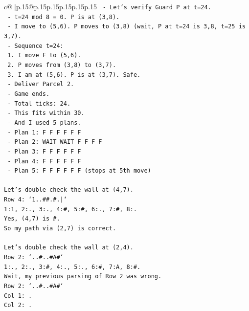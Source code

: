 \documentclass{article}
\begin{document}
{\begin{supertabular}{c@{$\;$}|p{.15\linewidth}@{}p{.15\linewidth}p{.15\linewidth}p{.15\linewidth}p{.15\linewidth}p{.15\linewidth}}
{{{\texttt{         {-} Let's verify Guard P at t=24.} \\
\texttt{         {-} t=24 mod 8 = 0. P is at (3,8).} \\
\texttt{         {-} I move to (5,6). P moves to (3,8) (wait, P at t=24 is 3,8, t=25 is 3,7).} \\
\texttt{         {-} Sequence t=24:} \\
\texttt{           1. I move F to (5,6).} \\
\texttt{           2. P moves from (3,8) to (3,7).} \\
\texttt{           3. I am at (5,6). P is at (3,7). Safe.} \\
\texttt{         {-} Deliver Parcel 2.} \\
\texttt{         {-} Game ends.} \\
\texttt{         {-} Total ticks: 24.} \\
\texttt{         {-} This fits within 30.} \\
\texttt{         {-} And I used 5 plans.} \\
\texttt{         {-} Plan 1: F F F F F F} \\
\texttt{         {-} Plan 2: WAIT WAIT F F F F} \\
\texttt{         {-} Plan 3: F F F F F F} \\
\texttt{         {-} Plan 4: F F F F F F} \\
\texttt{         {-} Plan 5: F F F F F F (stops at 5th move)} \\
\\ 
\texttt{Let's double check the wall at (4,7).} \\
\texttt{Row 4: `1..\#\#.\#.|`} \\
\texttt{1:1, 2:., 3:., 4:\#, 5:\#, 6:., 7:\#, 8:.} \\
\texttt{Yes, (4,7) is \#.} \\
\texttt{So my path via (2,7) is correct.} \\
\\ 
\texttt{Let's double check the wall at (2,4).} \\
\texttt{Row 2: `..\#..\#A\#`} \\
\texttt{1:., 2:., 3:\#, 4:., 5:., 6:\#, 7:A, 8:\#.} \\
\texttt{Wait, my previous parsing of Row 2 was wrong.} \\
\texttt{Row 2: `..\#..\#A\#`} \\
\texttt{Col 1: .} \\
\texttt{Col 2: .} \\
}}}
\end{supertabular}}
\end{document}
